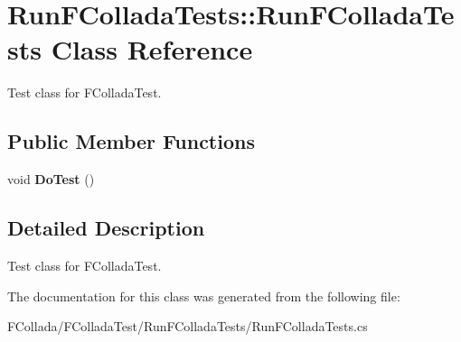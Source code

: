 \hypertarget{classRunFColladaTests_1_1RunFColladaTests}{
\section{RunFColladaTests::RunFColladaTests Class Reference}
\label{classRunFColladaTests_1_1RunFColladaTests}
}


Test class for FColladaTest.  


\subsection*{Public Member Functions}
\begin{DoxyCompactItemize}
\item 
\hypertarget{classRunFColladaTests_1_1RunFColladaTests_aaf530455c6a160706977be132448f9b8}{
void {\bfseries DoTest} ()}
\label{classRunFColladaTests_1_1RunFColladaTests_aaf530455c6a160706977be132448f9b8}

\end{DoxyCompactItemize}


\subsection{Detailed Description}
Test class for FColladaTest. 

The documentation for this class was generated from the following file:\begin{DoxyCompactItemize}
\item 
FCollada/FColladaTest/RunFColladaTests/RunFColladaTests.cs\end{DoxyCompactItemize}
